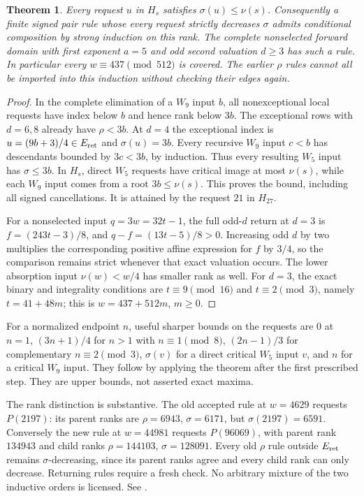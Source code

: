\documentclass[11pt]{article}
\newtheorem{theorem}{Theorem}
\begin{document}
\begin{theorem}\label{thm:sigmarank}
Every request $u$ in $H_s$ satisfies $\sigma(u)\le\nu(s)$. Consequently
a finite signed pair rule whose every request strictly decreases
$\sigma$ admits conditional composition by strong induction on this rank.
The complete nonselected forward domain with first exponent $a=5$ and
odd second valuation $d\ge3$ has such a rule. In particular every
$w\equiv437\pmod{512}$ is covered. The earlier $\rho$ rules cannot all
be imported into this induction without checking their edges again.
\end{theorem}
\begin{proof}
In the complete elimination of a $W_9$ input $b$, all nonexceptional
local requests have index below $b$ and hence rank below $3b$. The
exceptional rows with $d=6,8$ already have $\rho<3b$. At $d=4$ the
exceptional index is $u=(9b+3)/4\in E_{\rm ret}$ and
$\sigma(u)=3b$. Every recursive $W_9$ input $c<b$ has descendants
bounded by $3c<3b$, by induction. Thus every resulting $W_5$ input has
$\sigma\le3b$. In $H_s$, direct $W_5$ requests have critical image at
most $\nu(s)$, while each $W_9$ input comes from a root
$3b\le\nu(s)$. This proves the bound, including all signed cancellations.
It is attained by the request $21$ in $H_{27}$.

For a nonselected input $q=3w=32t-1$, the full odd-$d$ return at $d=3$
is $f=(243t-3)/8$, and $q-f=(13t-5)/8>0$. Increasing odd $d$ by two
multiplies the corresponding positive affine expression for $f$ by
$3/4$, so the comparison remains strict whenever that exact valuation
occurs. The lower absorption input $\nu(w)<w/4$ has smaller rank as well.
For $d=3$, the exact binary and integrality conditions are
$t\equiv9\pmod{16}$ and $t\equiv2\pmod3$, namely $t=41+48m$;
this is $w=437+512m$, $m\ge0$.
\end{proof}

For a normalized endpoint $n$, useful sharper bounds on the requests
are $0$ at $n=1$, $(3n+1)/4$ for $n>1$ with $n\equiv1\pmod8$,
$(2n-1)/3$ for complementary $n\equiv2\pmod3$, $\sigma(v)$ for a
direct critical $W_5$ input $v$, and $n$ for a critical $W_9$ input.
They follow by applying the theorem after the first prescribed step.
They are upper bounds, not asserted exact maxima.

The rank distinction is substantive. The old accepted rule at $w=4629$
requests $P(2197)$: its parent ranks are $\rho=6943$, $\sigma=6171$,
but $\sigma(2197)=6591$. Conversely the new rule at $w=44981$ requests
$P(96069)$, with parent rank $134943$ and child ranks
$\rho=144103$, $\sigma=128091$. Every old $\rho$ rule outside
$E_{\rm ret}$ remains $\sigma$-decreasing, since its parent ranks agree
and every child rank can only decrease. Returning rules require a fresh
check. No arbitrary mixture of the two inductive orders is licensed.
See .
\end{document}
